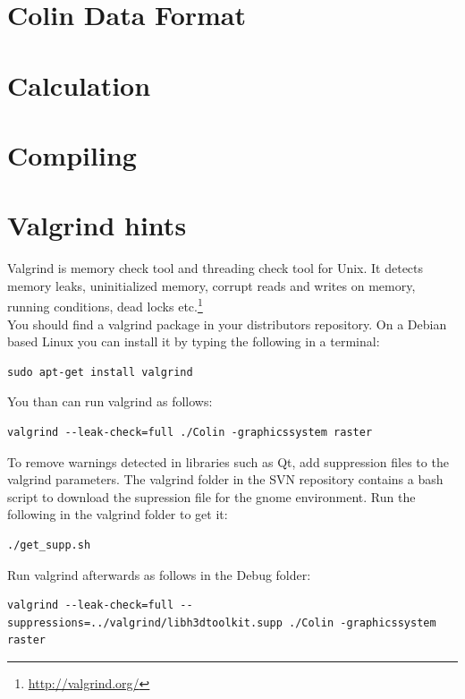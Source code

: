 \documentclass[a4paper,11pt]{report}
\begin{document}
\chapter{Colin Data Format}
\label{cha:data}

\chapter{Calculation}
\label{cha:calculation}


\chapter{Compiling}
\label{cha:compile}

\chapter{Valgrind hints}
\label{cha:valgrind}
Valgrind is memory check tool and threading check tool for Unix. It detects memory leaks, uninitialized memory, corrupt reads and writes on memory, running conditions, dead locks etc.\footnote{\url{http://valgrind.org/}}\\
You should find a valgrind package in your distributors repository. On a Debian based Linux you can install it by typing the following in a terminal:

\begin{lstlisting}[frame=single, breaklines=true, basicstyle=\small]
sudo apt-get install valgrind
\end{lstlisting}

You than can run valgrind as follows:
\begin{lstlisting}[frame=single, breaklines=true, basicstyle=\small]
valgrind --leak-check=full ./Colin -graphicssystem raster
\end{lstlisting}

To remove warnings detected in libraries such as Qt, add suppression files to the valgrind parameters. The valgrind folder in the SVN repository contains a bash script to download the supression file for the gnome environment. Run the following in the valgrind folder to get it:
\begin{lstlisting}[frame=single, breaklines=true, basicstyle=\small]
./get_supp.sh
\end{lstlisting}

Run valgrind afterwards as follows in the Debug folder:
\begin{lstlisting}[frame=single, breaklines=true, basicstyle=\small]
valgrind --leak-check=full --suppressions=../valgrind/libh3dtoolkit.supp ./Colin -graphicssystem raster
\end{lstlisting}
\end{document}
